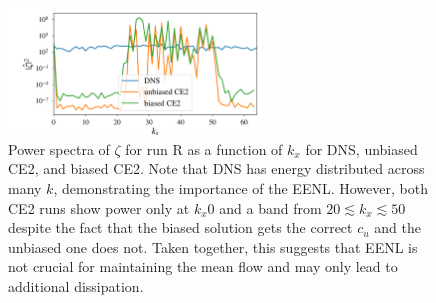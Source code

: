 \documentclass{jfm}
\newcommand{\cu}{c_u}
\begin{document}
\begin{figure}
  \centering
  \includegraphics[width=0.6\textwidth]{../../figs/kx_power_spectra_zeta_dns_run_R.pdf}
  \caption{Power spectra of $\zeta$ for run R as a function of $k_x$ for DNS, unbiased CE2, and biased CE2. Note that DNS has energy distributed across many $k$, demonstrating the importance of the EENL. However, both CE2 runs show power only at $k_x 0$ and a band from $20 \lesssim k_x \lesssim 50$ despite the fact that the biased solution gets the correct $\cu$ and the unbiased one does not. Taken together, this suggests that EENL is not crucial for maintaining the mean flow and may only lead to additional dissipation.}
  \label{fig:power_spec_S}
\end{figure}
\end{document}
